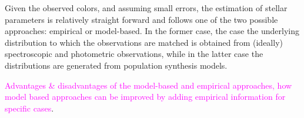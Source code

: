 \documentclass[linenumbers, twocolumn, trackchanges]{aastex631}
\newcommand{\magcom}[1]{\textcolor{magenta}{#1}} %
\begin{document}
Given the observed colors, and assuming small errors, the estimation of stellar parameters is relatively straight forward and follows one of the two possible approaches: empirical or model-based. In the former case, the case the underlying distribution to which the observations are matched is obtained from (ideally) spectroscopic and photometric observations, while in the latter case the distributions are generated from population synthesis models.

\magcom{Advantages \& disadvantages of the model-based and empirical approaches, how model based approaches can be improved by adding empirical information for specific cases}.



\appendix

{}


\end{document}
